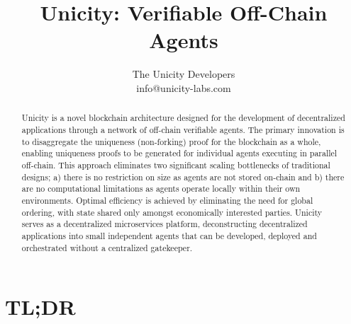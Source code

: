 \documentclass{article}
\title{Unicity: Verifiable Off-Chain Agents}
\author{The Unicity Developers\\info@unicity-labs.com}
\date{}
\begin{document}
\maketitle

\begin{abstract}

Unicity is a novel blockchain architecture designed for the development of decentralized applications through a network of off-chain verifiable agents. The primary innovation is to disaggregate the uniqueness (non-forking) proof for the blockchain as a whole, enabling uniqueness proofs to be generated for individual agents executing in parallel off-chain. This approach eliminates two significant scaling bottlenecks of traditional designs; a) there is no restriction on size as agents are not stored on-chain and b) there are no computational limitations as agents operate locally within their own environments. Optimal efficiency is achieved by eliminating the need for global ordering, with state shared only amongst economically interested parties. Unicity serves as a decentralized microservices platform, deconstructing decentralized applications into small independent agents that can be developed, deployed and orchestrated without a centralized gatekeeper.

\end{abstract}


\section*{TL;DR}
\end{document}
